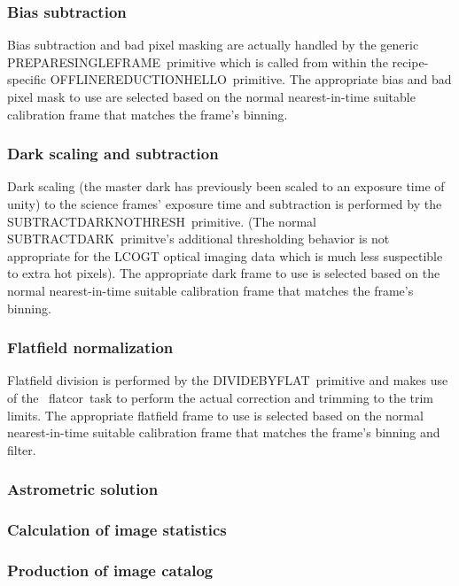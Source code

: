 \documentclass[twoside,11pt]{article}
\newcommand{\xref}[3]{#1}
\renewcommand{\_}{\texttt{\symbol{95}}}
\newcommand{\CCDPACK}{\xref{{\sc{Ccdpack}}}{sun139}{}}
\newcommand{\task}[1]{\textsf{#1}}
\begin{document}
\subsubsection{Bias subtraction}

Bias subtraction and bad pixel masking are actually handled by the generic
\task{\_PREPARE\_SINGLE\_FRAME\_}\ primitive which is called from within the
recipe-specific \task{\_OFFLINE\_REDUCTION\_HELLO\_}\ primitive. The appropriate
bias and bad pixel mask to use are selected based on the normal nearest-in-time
suitable calibration frame that matches the frame's binning.

\subsubsection{Dark scaling and subtraction}

Dark scaling (the master dark has previously been scaled to an exposure time of
unity) to the science frames' exposure time and subtraction is performed by the
\task{\_SUBTRACT\_DARK\_NO\_THRESH\_}\ primitive. (The normal
\task{\_SUBTRACT\_DARK\_}\ primitve's additional thresholding behavior is not
appropriate for the LCOGT optical imaging data which is much less suspectible to
extra hot pixels). The appropriate
dark frame to use is selected based on the normal nearest-in-time
suitable calibration frame that matches the frame's binning.

\subsubsection{Flatfield normalization}

Flatfield division is performed by the \task{\_DIVIDE\_BY\_FLAT\_}\ primitive
and makes use of the \CCDPACK\ \task{flatcor}\ task to perform the actual
correction and trimming to the trim limits. The appropriate
flatfield frame to use is selected based on the normal nearest-in-time
suitable calibration frame that matches the frame's binning and filter.

\subsubsection{Astrometric solution}
\subsubsection{Calculation of image statistics}
\subsubsection{Production of image catalog}
\end{document}
